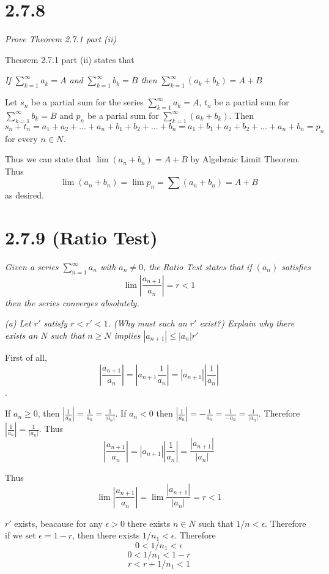 \documentclass[11pt,oneside,titlepage]{book}
\begin{document}
\section*{2.7.8}
\textit{Prove Theorem 2.7.1 part (ii)}

Theorem 2.7.1 part (ii) states that

\textit{If $\sum_{k = 1}^{\infty} a_k = A$ and $\sum_{k = 1}^{\infty} b_k = B$
then $\sum_{k = 1}^{\infty} (a_k + b_k) = A + B$}

Let $s_n$ be a partial sum for the series $\sum_{k = 1}^{\infty} a_k = A$,
$t_n$ be a partial sum for $\sum_{k = 1}^{\infty} b_k = B$ and
$p_n$ be a parial sum for $\sum_{k = 1}^{\infty} (a_k + b_k)$. Then
$$s_n + t_n = a_1 + a_2 + ... + a_n + b_1 + b_2 + ... + b_n =
a_1 + b_1 + a_2 + b_2 + ... + a_n + b_n = p_n $$
for every $n \in N$. 

Thus we can state that $\lim (a_n + b_n) = A + B$ by Algebraic Limit Theorem.
Thus 
$$\lim (a_n + b_n) = \lim p_n = \sum (a_n + b_n) = A + B$$
as desired.

\section*{2.7.9 (Ratio Test)}
\textit{Given a series $\sum_{n = 1}^{\infty} a_n$ with $a_n \neq 0$, the
  Ratio Test states that if $(a_n)$ satisfies}
$$\lim|\frac{a_{n + 1}}{a_n}| = r < 1$$
\textit{then the series converges absolutely.}

\textit{(a) Let $r'$ satisfy $r < r' < 1$. (Why must such an $r'$ exist?)
  Explain why there exists an $N$ such that $n \geq N$ implies
  $|a_{n + 1}| \leq |a_n|r'$}

First of all,
$$|\frac{a_{n + 1}}{a_n}| = |a_{n + 1} \frac{1}{a_n}| =  |a_{n + 1}| |\frac{1}{a_n}|$$.

If  $a_n \geq 0$, then $|\frac{1}{a_n}| = \frac{1}{a_n} = \frac{1}{|a_n|}$.
If $a_n < 0$ then $|\frac{1}{a_n}| = - \frac{1}{a_n} = \frac{1}{-a_n} =
\frac{1}{|a_n|}$. Therefore $|\frac{1}{a_n}| = \frac{1}{|a_n|}$. Thus 
$$|\frac{a_{n + 1}}{a_n}| = |a_{n + 1}| |\frac{1}{a_n}| =
\frac{|a_{n + 1}|}{|a_n|}$$

Thus
$$\lim|\frac{a_{n + 1}}{a_n}| = \lim\frac{|a_{n + 1}|}{|a_n|} = r < 1$$

$r'$ exists, beacause for any $\epsilon > 0$ there exists $n \in N$ such that
$1/n < \epsilon$. Therefore if we set $\epsilon = 1 - r$, then there exists
$1/n_1 < \epsilon$. Therefore
$$0 < 1/n_1 < \epsilon$$
$$0 < 1/n_1 < 1 - r$$
$$r < r + 1/n_1 < 1$$
\end{document}
